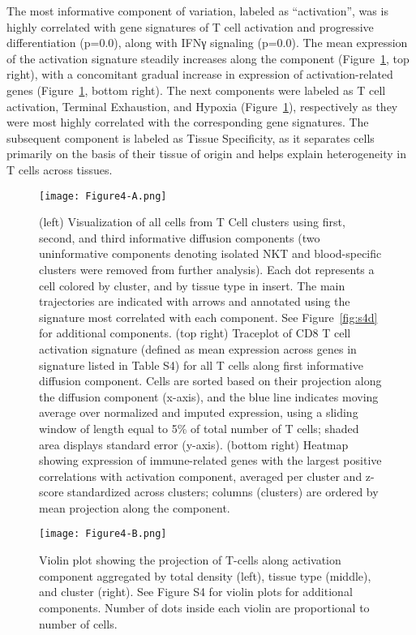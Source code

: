 The most informative component of variation, labeled as ``activation'', was is highly correlated with gene signatures of T cell activation and progressive differentiation (p=0.0), along with IFNγ signaling (p=0.0).
The mean expression of the activation signature steadily increases along the component (Figure~\ref{fig:4a}, top right), with a concomitant gradual increase in expression of activation-related genes (Figure~\ref{fig:4a}, bottom right).
The next components were labeled as T cell activation, Terminal Exhaustion, and Hypoxia (Figure~\ref{fig:4a}), respectively as they were most highly correlated with the corresponding gene signatures. %
The subsequent component is labeled as Tissue Specificity, as it separates cells primarily on the basis of their tissue of origin and helps explain heterogeneity in T cells across tissues.

\begin{figure}
\centering
\texttt{[image: Figure4-A.png]}
\caption{(left) Visualization of all cells from T Cell clusters using first, second, and third informative diffusion components (two uninformative components denoting isolated NKT and blood-specific clusters were removed from further analysis).
  Each dot represents a cell colored by cluster, and by tissue type in insert.
  The main trajectories are indicated with arrows and annotated using the signature most correlated with each component.
  See Figure~\ref{fig:s4d} for additional components.
  (top right) Traceplot of CD8 T cell activation signature (defined as mean expression across genes in signature listed in Table S4) for all T cells along first informative diffusion component.
  Cells are sorted based on their projection along the diffusion component (x-axis), and the blue line indicates moving average over normalized and imputed expression, using a sliding window of length equal to 5\% of total number of T cells; shaded area displays standard error (y-axis).
  (bottom right) Heatmap showing expression of immune-related genes with the largest positive correlations with activation component, averaged per cluster and z-score standardized across clusters; columns (clusters) are ordered by mean projection along the component.
}
\label{fig:4a}
\end{figure}


\begin{figure}
\centering
\texttt{[image: Figure4-B.png]}
\caption{Violin plot showing the projection of T-cells along activation component aggregated by total density (left), tissue type (middle), and cluster (right).
See Figure S4 for violin plots for additional components.
Number of dots inside each violin are proportional to number of cells.}
\label{fig:4b}
\end{figure}

